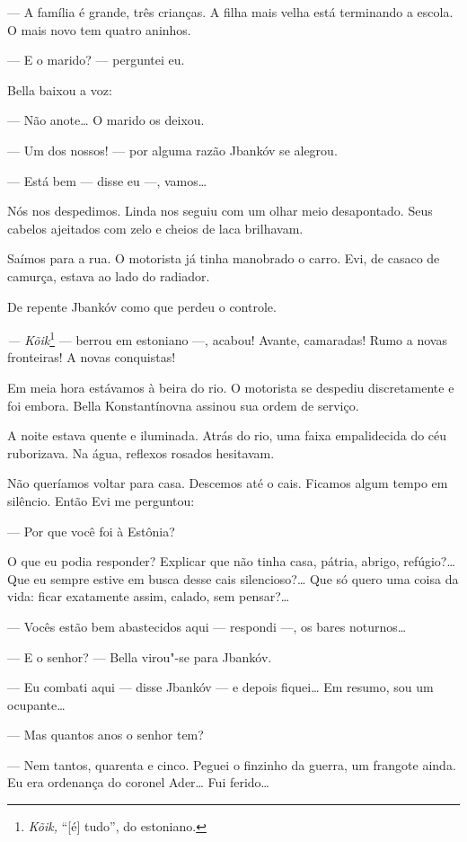 --- A família é grande, três crianças. A filha mais velha está
terminando a escola. O mais novo tem quatro aninhos.

--- E o marido? --- perguntei eu.

Bella baixou a voz:

--- Não anote\ldots{} O marido os deixou.

--- Um dos nossos! --- por alguma razão Jbankóv se
alegrou.

--- Está bem --- disse eu ---, vamos\ldots{}

Nós nos despedimos. Linda nos seguiu com um olhar meio desapontado. Seus cabelos ajeitados com zelo e cheios de laca brilhavam.

Saímos para a rua. O motorista já tinha manobrado o carro. Evi, de
casaco de camurça, estava ao lado do radiador.

De repente Jbankóv como que perdeu o controle.

\emph{--- Kõik}\footnote{\emph{Kõik,} ``{[}é{]} tudo'', do estoniano.}
--- berrou em estoniano ---, acabou! Avante, camaradas!
Rumo a novas fronteiras! A novas conquistas!

Em meia hora estávamos à beira do rio. O motorista se despediu
discretamente e foi embora. Bella Konstantínovna assinou sua ordem de
serviço.

A noite estava quente e iluminada. Atrás do rio, uma faixa empalidecida
do céu ruborizava. Na água, reflexos rosados hesitavam.

Não queríamos voltar para casa. Descemos até o cais. Ficamos algum tempo
em silêncio. Então Evi me perguntou:

--- Por que você foi à Estônia?

O que eu podia responder? Explicar que não tinha casa, pátria, abrigo,
refúgio?\ldots{} Que eu sempre estive em busca desse cais silencioso?\ldots{} Que
só quero uma coisa da vida: ficar exatamente assim, calado, sem
pensar?\ldots{}

--- Vocês estão bem abastecidos aqui --- respondi
---, os bares noturnos\ldots{}

--- E o senhor? --- Bella virou"-se para Jbankóv.

--- Eu combati aqui --- disse Jbankóv --- e depois
fiquei\ldots{} Em resumo, sou um ocupante\ldots{}

--- Mas quantos anos o senhor tem?

--- Nem tantos, quarenta e cinco. Peguei o finzinho da guerra, um
frangote ainda. Eu era ordenança do coronel Ader\ldots{} Fui ferido\ldots{}

